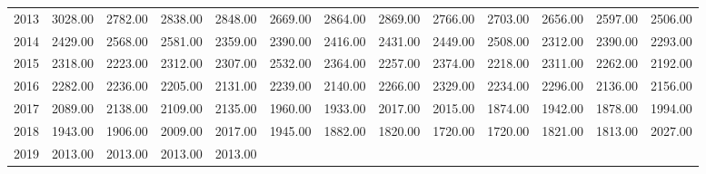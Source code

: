 \begin{longtable}{rrrrrrrrrrrrr}
  2013 & 3028.00 & 2782.00 & 2838.00 & 2848.00 & 2669.00 & 2864.00 & 2869.00 & 2766.00 & 2703.00 & 2656.00 & 2597.00 & 2506.00 \\ 
  2014 & 2429.00 & 2568.00 & 2581.00 & 2359.00 & 2390.00 & 2416.00 & 2431.00 & 2449.00 & 2508.00 & 2312.00 & 2390.00 & 2293.00 \\ 
  2015 & 2318.00 & 2223.00 & 2312.00 & 2307.00 & 2532.00 & 2364.00 & 2257.00 & 2374.00 & 2218.00 & 2311.00 & 2262.00 & 2192.00 \\ 
  2016 & 2282.00 & 2236.00 & 2205.00 & 2131.00 & 2239.00 & 2140.00 & 2266.00 & 2329.00 & 2234.00 & 2296.00 & 2136.00 & 2156.00 \\ 
  2017 & 2089.00 & 2138.00 & 2109.00 & 2135.00 & 1960.00 & 1933.00 & 2017.00 & 2015.00 & 1874.00 & 1942.00 & 1878.00 & 1994.00 \\ 
  2018 & 1943.00 & 1906.00 & 2009.00 & 2017.00 & 1945.00 & 1882.00 & 1820.00 & 1720.00 & 1720.00 & 1821.00 & 1813.00 & 2027.00 \\ 
  2019 & 2013.00 & 2013.00 & 2013.00 & 2013.00 &  &  &  &  &  &  &  &  \\ 
   \hline
\hline
\end{longtable}
